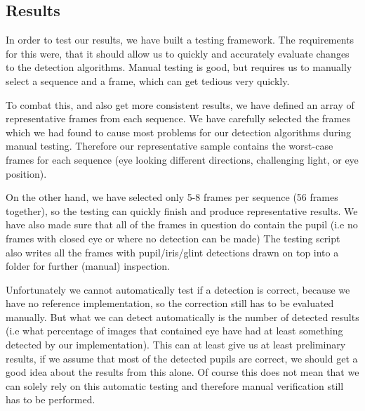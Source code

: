 \subsection{Results}

In order to test our results, we have built a testing framework. The requirements for this were, that it should allow us to quickly and accurately evaluate changes to the detection algorithms. Manual testing is good, but requires us to manually select a sequence and a frame, which can get tedious very quickly.

To combat this, and also get more consistent results, we have defined an array of representative frames from each sequence. We have carefully selected the frames which we had found to cause most problems for our detection algorithms during manual testing. Therefore our representative sample contains the worst-case frames for each sequence (eye looking different directions, challenging light, or eye position). 

On the other hand, we have selected only 5-8 frames per sequence (56 frames together), so the testing can quickly finish and produce representative results. We have also made sure that all of the frames in question do contain the pupil (i.e no frames with closed eye or where no detection can be made) The testing script also writes all the frames with pupil/iris/glint detections drawn on top into a folder for further (manual) inspection.

Unfortunately we cannot automatically test if a detection is correct, because we have no reference implementation, so the correction still has to be evaluated manually. But what we can detect automatically is the number of detected results (i.e what percentage of images that contained eye have had at least something detected by our implementation). This can at least give us  at least preliminary results, if we assume that most of the detected pupils are correct, we should get a good idea about the results from this alone. Of course this does not mean that we can solely rely on this automatic testing and therefore manual verification still has to be performed.

